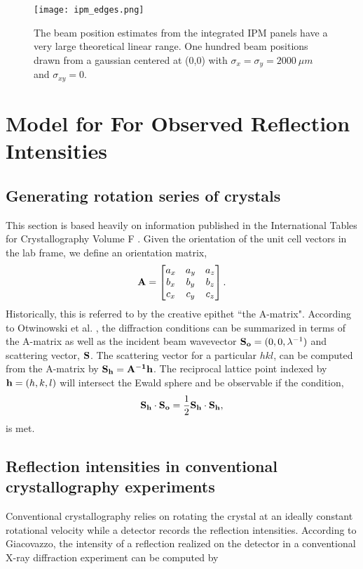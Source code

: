 \documentclass{report}
\begin{document}
\begin{figure} 
\centering
\texttt{[image: ipm\_edges.png]}
\caption{The beam position estimates from the integrated IPM panels have a very large theoretical linear range. One hundred beam positions drawn from a gaussian centered at (0,0) with $\sigma_x=\sigma_y=2000\ \mu m$ and $\sigma_{xy}=0$.}
\label{fig:ipm_linearity}
\end{figure}

\section{Model for For Observed Reflection Intensities}
\subsection{Generating rotation series of crystals}
This section is based heavily on information published in the International Tables for Crystallography Volume F \cite{Otwinowski2012-yb}. 
Given the orientation of the unit cell vectors in the lab frame, we define an orientation matrix, 
\begin{equation}
\bold{A}
=
\begin{bmatrix}
a_x & a_y & a_z \\
b_x & b_y & b_z \\
c_x & c_y & c_z \\
\end{bmatrix}.
\end{equation}
Historically, this is referred to by the creative epithet ``the A-matrix". 
According to Otwinowski et al. \cite{Otwinowski2012-yb}, the diffraction conditions can be summarized in terms of the A-matrix as well as the incident beam wavevector $\bold{S_o} = (0, 0, \lambda ^{-1})$ and scattering vector, $\bold{S}$. 
The scattering vector for a particular $hkl$, can be computed from the A-matrix by $\bold{S_h}=\bold{A^{-1}h}$. 
The reciprocal lattice point indexed by $\bold{h}=(h, k, l)$ will intersect the Ewald sphere and be observable if the condition,
\begin{equation}
\bold{S_h\cdot S_o} = \frac{1}{2}\bold{S_h\cdot S_h},
\end{equation}
is met. 

\subsection{Reflection intensities in conventional crystallography experiments}
Conventional crystallography relies on rotating the crystal at an ideally constant rotational velocity while a detector records the reflection intensities. 
According to Giacovazzo\cite{Giacovazzo2011-wp}, the intensity of a reflection realized on the detector in a conventional X-ray diffraction experiment can be computed by
\end{document}

